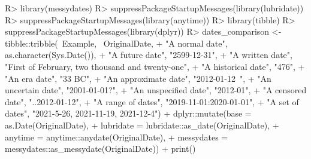 \documentclass[
]{jss}
\begin{document}
\begin{CodeChunk}
\begin{CodeInput}
R> library(messydates)
R> suppressPackageStartupMessages(library(lubridate))
R> suppressPackageStartupMessages(library(anytime))
R> library(tibble)
R> suppressPackageStartupMessages(library(dplyr))
R> dates_comparison <- tibble::tribble(~Example, ~OriginalDate,
+                                     "A normal date", as.character(Sys.Date()),
+                                     "A future date", "2599-12-31",
+                                     "A written date", "First of February, two thousand and twenty-one",
+                                     "A historical date", "476",
+                                     "An era date", "33 BC",
+                                     "An approximate date", "2012-01-12~",
+                                     "An uncertain date", "2001-01-01?",
+                                     "An unspecified date", "2012-01",
+                                     "A censored date", "..2012-01-12", 
+                                     "A range of dates", "2019-11-01:2020-01-01",
+                                     "A set of dates", "2021-5-26, 2021-11-19, 2021-12-4") %
+   dplyr::mutate(base = as.Date(OriginalDate),
+                 lubridate = lubridate::as_date(OriginalDate),
+                 anytime = anytime::anydate(OriginalDate),
+                 messydates = messydates::as_messydate(OriginalDate)) %
+   print()
\end{CodeInput}
\begin{CodeOutput}
# A tibble: 11 x 6
   Example             OriginalDate  base       lubridate  anytime    messydates
   <chr>               <chr>         <date>     <date>     <date>     <mdate>   
 1 A normal date       2022-06-08    2022-06-08 2022-06-08 2022-06-08 2022-06-0~
 2 A future date       2599-12-31    2599-12-31 2599-12-31 2599-12-31 2599-12-3~
 3 A written date      First of Feb~ NA         NA         NA         2021-02-0~
 4 A historical date   476           NA         NA         NA         0476     ~
 5 An era date         33 BC         NA         NA         NA         -0033    ~
 6 An approximate date 2012-01-12~   2012-01-12 2012-01-12 2012-01-12 2012-01-1~
 7 An uncertain date   2001-01-01?   2001-01-01 2001-01-01 2001-01-01 2001-01-0~
 8 An unspecified date 2012-01       NA         2020-12-01 2012-01-01 2012-01  ~
 9 A censored date     ..2012-01-12  NA         2012-01-12 NA         ..2012-01~
10 A range of dates    2019-11-01:2~ 2019-11-01 2019-11-01 2019-11-01 2019-11-0~
11 A set of dates      2021-5-26, 2~ 2021-05-26 NA         2021-05-26 {2021-05-~
\end{CodeOutput}
\end{CodeChunk}
\end{document}
